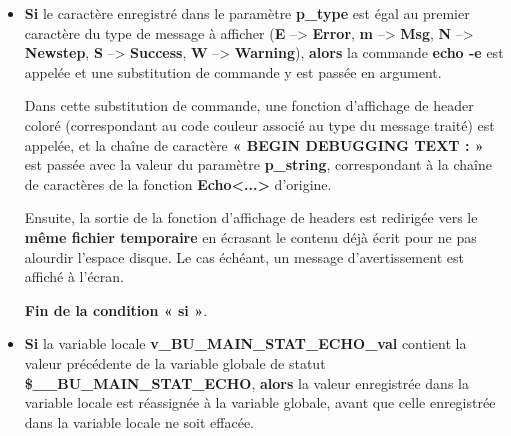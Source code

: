 \documentclass[a4paper,10pt]{article}
\begin{document}
\begin{itemize}
{\begin{itemize}
            \item
            {
                \setlength{\parskip}{2em}

                \begin{justify}
                    \textbf{\color{cond}Si} le caractère enregistré dans le paramètre \textbf{\color{vars}p\_type} est égal au premier caractère du type de message à afficher (\textbf{E} --> \textbf{Error}, \textbf{m} --> \textbf{Msg}, \textbf{N} --> \textbf{Newstep}, \textbf{S} --> \textbf{Success}, \textbf{W} --> \textbf{Warning}), \textbf{\color{cond}alors} la commande \textbf{\color{cmds}echo -e} est appelée et une substitution de commande y est passée en argument.
                \end{justify}

                \setlength{\parskip}{1em}

                \begin{justify}
                    Dans cette substitution de commande, une fonction d'affichage de header coloré (correspondant au code couleur associé au type du message traité) est appelée, et la chaîne de caractère \textbf{« BEGIN DEBUGGING TEXT : »} est passée avec la valeur du paramètre \textbf{\color{vars}p\_string}, correspondant à la chaîne de caractères de la fonction \textbf{\color{func}Echo<...>} d'origine.
                \end{justify}

                \begin{justify}
                    Ensuite, la sortie de la fonction d'affichage de headers est redirigée vers le \textbf{\color{path}même fichier temporaire} en écrasant le contenu déjà écrit pour ne pas alourdir l'espace disque. Le cas échéant, un message d'avertissement est affiché à l'écran.
                \end{justify}

                \begin{justify}
                    \textbf{\color{cond}Fin de la condition « si »}.
                \end{justify}
            }

            \item
            {
                \setlength{\parskip}{2em}

                \begin{justify}
                    \textbf{\color{cond}Si} la variable locale \textbf{\color{vars}v\_BU\_MAIN\_STAT\_ECHO\_val} contient la valeur précédente de la variable globale de statut \textbf{\color{vars}\$\_\_BU\_MAIN\_STAT\_ECHO}, \textbf{\color{cond}alors} la valeur enregistrée dans la variable locale est réassignée à la variable globale, avant que celle enregistrée dans la variable locale ne soit effacée.
                \end{justify}\setlength{\parskip}{1em}

}
\end{itemize}}
\end{itemize}
\end{document}
